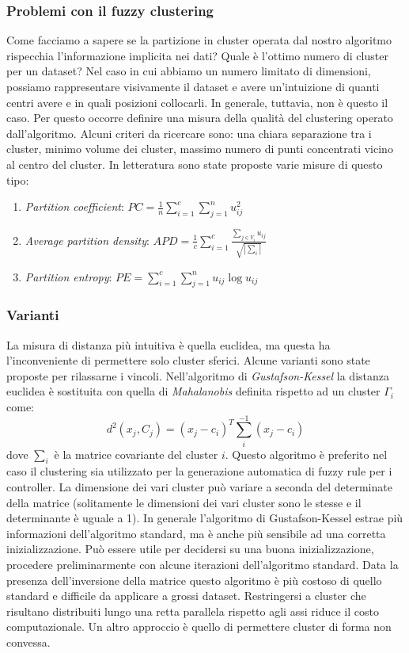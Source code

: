 \documentclass[10pt,a4paper]{article}
\begin{document}
\subsubsection{Problemi con il fuzzy clustering}

Come facciamo a sapere se la partizione in cluster operata dal nostro algoritmo rispecchia l'informazione implicita nei dati? Quale è l'ottimo numero di cluster per un dataset? Nel caso in cui abbiamo un numero limitato di dimensioni, possiamo rappresentare visivamente il dataset e avere un'intuizione di quanti centri avere e in quali posizioni collocarli. In generale, tuttavia, non è questo il caso. Per questo occorre definire una misura della qualità del clustering operato dall'algoritmo. Alcuni criteri da ricercare sono: una chiara separazione tra i cluster, minimo volume dei cluster, massimo numero di punti concentrati vicino al centro del cluster. In letteratura sono state proposte varie misure di questo tipo:

\begin{enumerate}
\item{\emph{Partition coefficient}: $PC = \frac{1}{n}\sum_{i=1}^{c} \sum_{j=1}^{n} u_{ij}^2$}
\item{\emph{Average partition density}: $APD = \frac{1}{c} \sum_{i=1}^c \frac{\sum_{j \in Y_i} u_{ij}}{\sqrt{|\sum_i|}}$}
\item{\emph{Partition entropy}: $PE = \sum_{i=1}^{c} \sum_{j=1}^{n} u_{ij} \log u_{ij}$}
\end{enumerate}

\subsubsection{Varianti}

La misura di distanza più intuitiva è quella euclidea, ma questa ha l'inconveniente di permettere solo cluster sferici. Alcune varianti sono state proposte per rilassarne i vincoli. Nell'algoritmo di \emph{Gustafson-Kessel} la distanza euclidea è sostituita con quella di \emph{Mahalanobis} definita rispetto ad un cluster $\Gamma_i$ come:
$$
d^2(x_j,C_j) = (x_j - c_i)^T \sum_i^{-1} (x_j - c_i)
$$
dove $\sum_i$ è la matrice covariante del cluster $i$. Questo algoritmo è preferito nel caso il clustering sia utilizzato per la generazione automatica di fuzzy rule per i controller. La dimensione dei vari cluster può variare a seconda del determinate della matrice (solitamente le dimensioni dei vari cluster sono le stesse e il determinante è uguale a 1). In generale l'algoritmo di Gustafson-Kessel estrae più informazioni dell'algoritmo standard, ma è anche più sensibile ad una corretta inizializzazione. Può essere utile per decidersi su una buona inizializzazione, procedere preliminarmente con alcune iterazioni dell'algoritmo standard. Data la presenza dell'inversione della matrice questo algoritmo è più costoso di quello standard e difficile da applicare a grossi dataset. Restringersi a cluster che risultano distribuiti lungo una retta parallela rispetto agli assi riduce il costo computazionale. Un altro approccio è quello di permettere cluster di forma non convessa.
\end{document}
